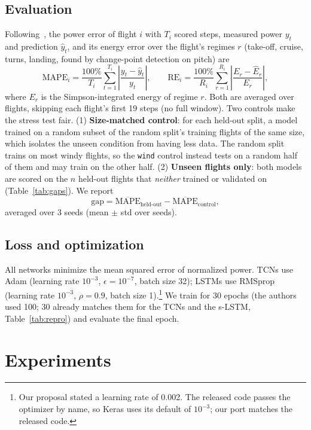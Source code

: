 \documentclass{article}
\begin{document}
\subsection{Evaluation}
Following~\cite{choudhry2021}, the power error of flight $i$ with $T_i$ scored steps, measured power $y_t$ and
prediction $\hat y_t$, and its energy error over the flight's regimes $r$ (take-off, cruise, turns, landing,
found by change-point detection on pitch) are
\begin{equation}
  \mathrm{MAPE}_i = \frac{100\%}{T_i}\sum_{t=1}^{T_i}\left|\frac{y_t-\hat y_t}{y_t}\right|, \qquad
  \mathrm{RE}_i = \frac{100\%}{R_i}\sum_{r=1}^{R_i}\left|\frac{E_r-\hat E_r}{E_r}\right|,
\end{equation}
where $E_r$ is the Simpson-integrated energy of regime $r$. Both are averaged over flights, skipping each flight's
first 19 steps (no full window). Two controls make the stress test fair. (1) \textbf{Size-matched control}: for
each held-out split, a model trained on a random subset of the random split's training flights of the same size,
which isolates the unseen condition from having less data. The random split trains on most windy flights, so the
\texttt{wind} control instead tests on a random half of them and may train on the other half. (2) \textbf{Unseen flights only}: both models are scored on the $n$ held-out flights
that \emph{neither} trained or validated on (Table~\ref{tab:gaps}). We report
\begin{equation}
  \mathrm{gap} = \overline{\mathrm{MAPE}}_{\text{held-out}} - \overline{\mathrm{MAPE}}_{\text{control}},
\end{equation}
averaged over 3 seeds (mean $\pm$ std over seeds).

\subsection{Loss and optimization}
All networks minimize the mean squared error of normalized power. TCNs use Adam (learning rate $10^{-3}$,
$\epsilon=10^{-7}$, batch size 32); LSTMs use RMSprop (learning rate $10^{-3}$, $\rho=0.9$, batch size
1).\footnote{Our proposal stated a learning rate of 0.002. The released code passes the optimizer by name, so Keras
uses its default of $10^{-3}$; our port matches the released code.} We train for 30 epochs (the authors used 100;
30 already matches them for the TCNs and the s-LSTM, Table~\ref{tab:repro}) and evaluate the final epoch.

\section{Experiments}
\end{document}
